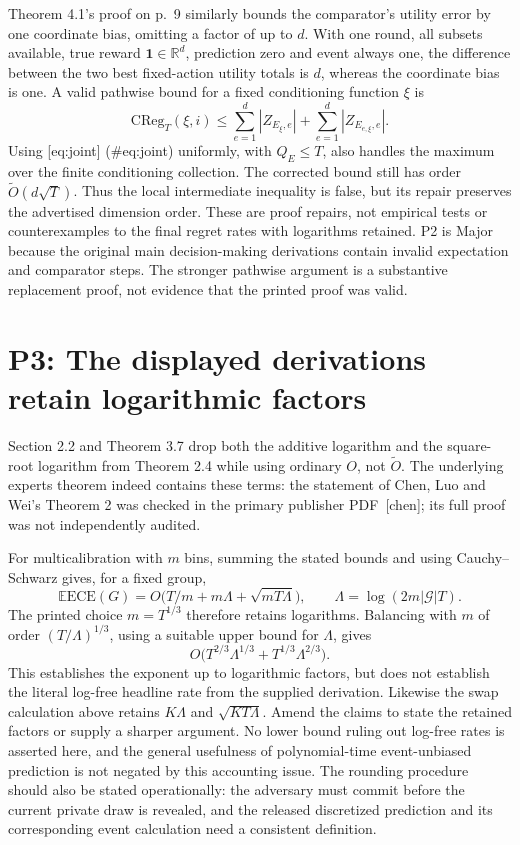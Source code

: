 \documentclass[10pt]{article}
\begin{document}
Theorem 4.1’s proof on p. 9 similarly bounds the comparator’s utility error by one coordinate bias, omitting a factor of up to \(d\). With one round, all subsets available, true reward \(\mathbf1\in\mathbb R^d\), prediction zero and event always one, the difference between the two best fixed-action utility totals is \(d\), whereas the coordinate bias is one. A valid pathwise bound for a fixed conditioning function \(\xi\) is \[\mathrm{CReg}_T(\xi,i)\leq
 \sum_{e=1}^d|Z_{E_\xi,e}|+
 \sum_{e=1}^d|Z_{E_{e,\xi},e}|.\] Using [eq:joint] (\#eq:joint) uniformly, with \(Q_E\leq T\), also handles the maximum over the finite conditioning collection. The corrected bound still has order \(\widetilde O(d\sqrt T)\). Thus the local intermediate inequality is false, but its repair preserves the advertised dimension order. These are proof repairs, not empirical tests or counterexamples to the final regret rates with logarithms retained. P2 is Major because the original main decision-making derivations contain invalid expectation and comparator steps. The stronger pathwise argument is a substantive replacement proof, not evidence that the printed proof was valid.\par
\section*{P3: The displayed derivations retain logarithmic factors}
Section 2.2 and Theorem 3.7 drop both the additive logarithm and the square-root logarithm from Theorem 2.4 while using ordinary \(O\), not \(\widetilde O\). The underlying experts theorem indeed contains these terms: the statement of Chen, Luo and Wei’s Theorem 2 was checked in the primary publisher PDF [chen]; its full proof was not independently audited.\par
For multicalibration with \(m\) bins, summing the stated bounds and using Cauchy–Schwarz gives, for a fixed group, \[\mathbb E\mathrm{ECE}(G)
 =O\bigl(T/m+m\Lambda+\sqrt{mT\Lambda}\bigr),
 \qquad \Lambda=\log(2m|\mathcal G|T).\] The printed choice \(m=T^{1/3}\) therefore retains logarithms. Balancing with \(m\) of order \((T/\Lambda)^{1/3}\), using a suitable upper bound for \(\Lambda\), gives \[O\bigl(T^{2/3}\Lambda^{1/3}+T^{1/3}\Lambda^{2/3}\bigr).\] This establishes the exponent up to logarithmic factors, but does not establish the literal log-free headline rate from the supplied derivation. Likewise the swap calculation above retains \(K\Lambda\) and \(\sqrt{KT\Lambda}\). Amend the claims to state the retained factors or supply a sharper argument. No lower bound ruling out log-free rates is asserted here, and the general usefulness of polynomial-time event-unbiased prediction is not negated by this accounting issue. The rounding procedure should also be stated operationally: the adversary must commit before the current private draw is revealed, and the released discretized prediction and its corresponding event calculation need a consistent definition.\par
\end{document}

